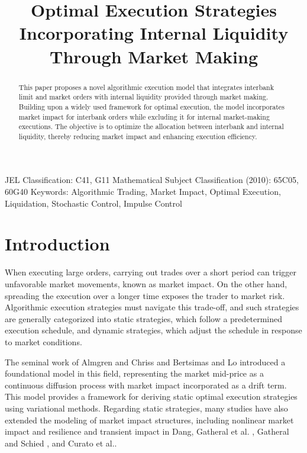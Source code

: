 \documentclass[12pt]{article}
\begin{document}
\title{Optimal Execution Strategies Incorporating Internal Liquidity Through Market Making}

\date{}
\maketitle
\begin{abstract}
This paper proposes a novel algorithmic execution model that integrates interbank limit and market orders with internal liquidity provided through market making. 
Building upon a widely used framework for optimal execution, the model incorporates market impact for interbank orders while excluding it for internal market-making executions. The objective is to optimize the allocation between interbank and internal liquidity, thereby reducing market impact and enhancing execution efficiency.
\end{abstract}

JEL Classification: C41, G11
Mathematical Subject Classification (2010): 65C05, 60G40
Keywords: Algorithmic Trading, Market Impact, Optimal Execution, Liquidation, Stochastic Control, Impulse Control

\section{Introduction}
When executing large orders, carrying out trades over a short period can trigger unfavorable market movements, known as market impact. 
On the other hand, spreading the execution over a longer time exposes the trader to market risk. 
Algorithmic execution strategies must navigate this trade-off, 
and such strategies are generally categorized into static strategies, 
which follow a predetermined execution schedule, and dynamic strategies, 
which adjust the schedule in response to market conditions.

The seminal work of Almgren and Chriss \cite{almgren2001optimal} and Bertsimas and Lo \cite{bertsimas1998optimal} introduced a foundational model in this field, 
representing the market mid-price as a continuous diffusion process with market impact 
incorporated as a drift term. This model provides a framework for deriving static optimal execution strategies using variational methods.
Regarding static strategies, many studies have also extended the modeling of market impact structures, 
including nonlinear market impact and resilience and transient impact in Dang\cite{dang2017optimal}, Gatheral et al. \cite{gatheral2011exponential}, Gatheral and Schied \cite{gatheral2012transient}, and Curato et al.\cite{curato2017optimal}.
\end{document}
